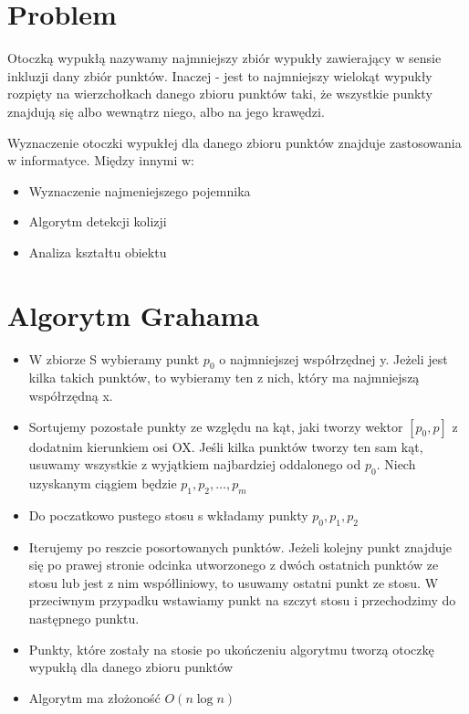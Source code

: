 \documentclass[12pt]{article}
\begin{document}
\newpage
\LARGE
\section{Problem}
Otoczką wypukłą nazywamy najmniejszy zbiór wypukły zawierający w sensie inkluzji dany zbiór punktów. Inaczej - jest to najmniejszy wielokąt wypukły rozpięty na wierzchołkach danego zbioru punktów taki, że wszystkie punkty znajdują się albo wewnątrz niego, albo na jego krawędzi.

Wyznaczenie otoczki wypukłej dla danego zbioru punktów znajduje zastosowania w informatyce. Między innymi w:
\begin{itemize}
\item Wyznaczenie najmeniejszego pojemnika
\item Algorytm detekcji kolizji
\item Analiza kształtu obiektu
\end{itemize}
\newpage
\section{Algorytm Grahama}
\begin{itemize}
\item W zbiorze S wybieramy punkt $p_0$ o najmniejszej współrzędnej y. Jeżeli jest kilka takich punktów, to wybieramy ten z nich, który ma najmniejszą współrzędną x.
\item Sortujemy pozostałe punkty ze względu na kąt, jaki tworzy wektor $[p_0, p]$ z dodatnim kierunkiem osi OX. Jeśli kilka punktów tworzy ten sam kąt, usuwamy wszystkie z wyjątkiem najbardziej oddalonego od $p_0$. Niech uzyskanym ciągiem będzie $p_1, p_2, \dots , p_m$
\item Do poczatkowo pustego stosu s wkładamy punkty $p_0, p_1, p_2$\
\item Iterujemy po reszcie posortowanych punktów. Jeżeli kolejny punkt znajduje się po prawej stronie odcinka utworzonego z dwóch ostatnich punktów ze stosu lub jest z nim współliniowy, to usuwamy ostatni punkt ze stosu. W przeciwnym przypadku wstawiamy punkt na szczyt stosu i przechodzimy do następnego punktu.
\item Punkty, które zostały na stosie po ukończeniu algorytmu tworzą otoczkę wypukłą dla danego zbioru punktów
\item Algorytm ma złożoność $O(n\log n)$
\end{itemize}

\newpage
\end{document}
